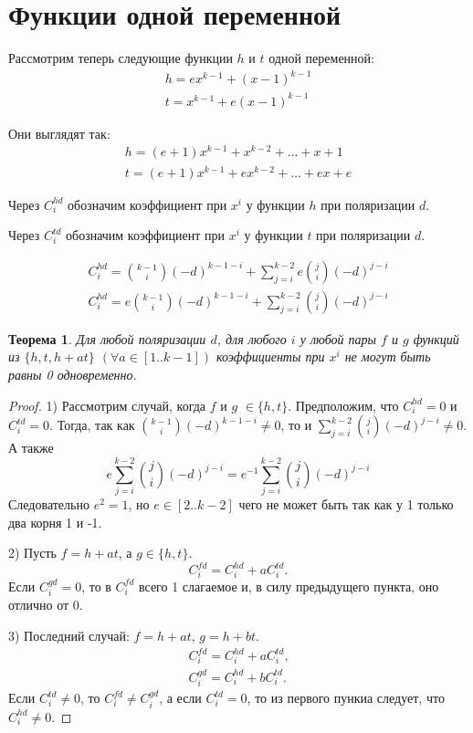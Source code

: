 \documentclass [12pt, a4paper] {article}
\newtheorem{myth}{Теорема}
\begin{document}
\section{Функции одной переменной}
Рассмотрим теперь следующие функции $h$ и $t$ одной переменной:
\[
    \begin{array}{l}
        h = ex^{k-1} + (x-1)^{k-1} \\
        t = x^{k-1} + e(x-1)^{k-1}
    \end{array}
\]

Они выглядят так:
\[
    \begin{array}{l}
        h = (e+1)x^{k-1} + x^{k-2} + \dots + x + 1\\
        t = (e+1)x^{k-1} + ex^{k-2} + \dots + ex + e
    \end{array}
\]

Через $C_i^{hd}$ обозначим коэффициент при $x^i$ у функции $h$ при поляризации
$d$.

Через $C_i^{td}$ обозначим коэффициент при $x^i$ у функции $t$ при поляризации
$d$.

\[
    \begin{array}{l}
        C_i^{hd} = \binom{k-1}{i} (-d)^{k-1-i} +
            \sum\limits_{j=i}^{k-2} e \binom{j}{i} (-d)^{j-i} \\
        C_i^{hd} = e \binom{k-1}{i} (-d)^{k-1-i} +
            \sum\limits_{j=i}^{k-2} \binom{j}{i} (-d)^{j-i}
    \end{array}
\]

\begin{myth}
    Для любой поляризации $d$, для любого $i$ у любой пары $f$ и $g$ функций из
    $\{h, t, h + at\}$ $(\forall a \in [1..k-1])$ коэффициенты при $x^i$ не
    могут быть равны 0 одновременно.
\end{myth}
\begin{proof}
    
    1) Рассмотрим случай, когда $f$ и $g$ $\in \{h, t\}$.
    Предположим, что $C_i^{hd} = 0$ и $C_i^{td} = 0$. Тогда, так как
    $\binom{k-1}{i} (-d)^{k-1-i} \neq 0$, то и $\sum\limits_{j=i}^{k-2}
    \binom{j}{i} (-d)^{j-i} \neq 0$. А также 
    \[
        e \sum\limits_{j=i}^{k-2} \binom{j}{i} (-d)^{j-i} = 
        e^{-1} \sum\limits_{j=i}^{k-2} \binom{j}{i} (-d)^{j-i}
    \]
    Следовательно $e^2 = 1$, но $e \in [2..k-2]$ чего не может быть так как
    у 1 только два корня 1 и -1.

    2) Пусть $f = h + at$, а $g \in \{h, t\}$.
    \[
        C_i^{fd} = C_i^{hd} + aC_i^{td} \text{.}
    \]
    Если $C_i^{gd} = 0$, то в $C_i^{fd}$ всего 1 слагаемое и, в силу
    предыдущего пункта, оно отлично от 0.

    3) Последний случай: $f = h + at$, $g = h + bt$.
    \[
        \begin{array}{l}
            C_i^{fd} = C_i^{hd} + aC_i^{td} \text{,} \\
            C_i^{gd} = C_i^{hd} + bC_i^{td} \text{.}
        \end{array}
    \]
    Если $C_i^{td} \neq 0$, то $C_i^{fd} \neq C_i^{gd}$, а если $C_i^{td} = 0$,
    то из первого пункиа следует, что $C_i^{hd} \neq 0$.

\end{proof}
\end{document}

